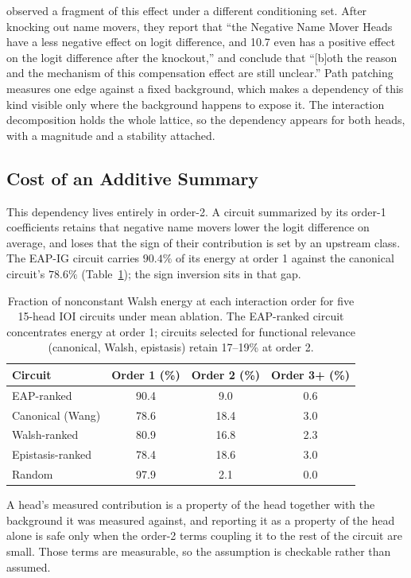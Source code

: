 \documentclass{article}
\begin{document}
\citet{wang2022ioi} observed a fragment of this effect under a different conditioning set.
After knocking out name movers, they report that ``the Negative Name Mover Heads have a less
negative effect on logit difference, and 10.7 even has a positive effect on the logit
difference after the knockout,'' and conclude that ``[b]oth the reason and the mechanism of
this compensation effect are still unclear.'' Path patching measures one edge against a
fixed background, which makes a dependency of this kind visible only where the background
happens to expose it. The interaction decomposition holds the whole lattice, so the
dependency appears for both heads, with a magnitude and a stability attached.

\subsection{Cost of an Additive Summary}

This dependency lives entirely in order-2. A circuit summarized by its order-1 coefficients
retains that negative name movers lower the logit difference on average, and loses that the
sign of their contribution is set by an upstream class. The EAP-IG circuit
carries $90.4\%$ of its energy at order 1 against the canonical circuit's $78.6\%$
(Table~\ref{tab:energy}); the sign inversion sits in that gap.

\begin{table}[h]
\centering
\begin{tabular}{lccc}
\toprule
Circuit & Order 1 (\%) & Order 2 (\%) & Order 3{+} (\%) \\
\midrule
EAP-ranked           & 90.4 & 9.0  & 0.6 \\
Canonical (Wang)     & 78.6 & 18.4 & 3.0 \\
Walsh-ranked         & 80.9 & 16.8 & 2.3 \\
Epistasis-ranked     & 78.4 & 18.6 & 3.0 \\
Random               & 97.9 & 2.1  & 0.0 \\
\bottomrule
\end{tabular}
\caption{Fraction of nonconstant Walsh energy at each interaction order
for five 15-head IOI circuits under mean ablation. The EAP-ranked circuit
concentrates energy at order 1; circuits selected for functional relevance
(canonical, Walsh, epistasis) retain 17--19\% at order 2.}
\label{tab:energy}
\end{table}

A head's measured contribution is a
property of the head together with the background it was measured against, and reporting it
as a property of the head alone is safe only when the order-2 terms coupling it to the rest
of the circuit are small. Those terms are measurable, so the assumption is checkable rather
than assumed.
\end{document}
